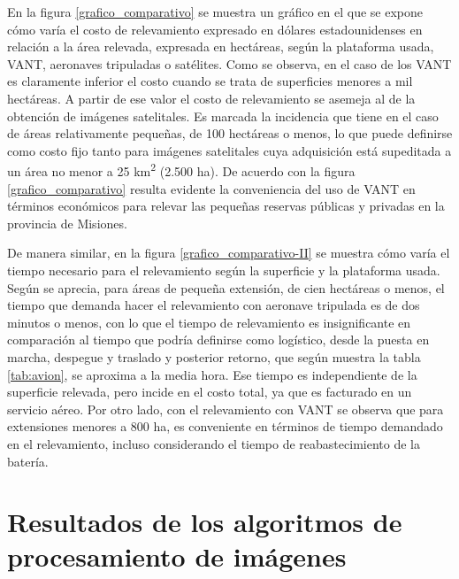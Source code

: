En la figura \ref{grafico_comparativo} se muestra un gráfico en el que se expone cómo varía el costo de relevamiento expresado en dólares estadounidenses en relación a la área relevada, expresada en hectáreas, según la plataforma usada, VANT, aeronaves tripuladas o satélites. Como se observa, en el caso de los VANT es claramente inferior el costo cuando se trata de superficies menores a mil hectáreas. A partir de ese valor el costo de relevamiento se asemeja al de la obtención de imágenes satelitales. Es marcada la incidencia que tiene en el caso de áreas relativamente pequeñas, de 100 hectáreas o menos, lo que puede definirse como costo fijo tanto para imágenes satelitales cuya adquisición está supeditada a un área no menor a 25 km\textsuperscript{2} (2.500 ha). De acuerdo con la figura \ref{grafico_comparativo} resulta evidente la conveniencia del uso de VANT en términos económicos para relevar las pequeñas reservas públicas y privadas en la provincia de Misiones.

De manera similar, en la figura \ref{grafico_comparativo-II} se muestra cómo varía el tiempo necesario para el relevamiento según la superficie y la plataforma usada. Según se aprecia, para áreas de pequeña extensión, de cien hectáreas o menos, el tiempo que demanda hacer el relevamiento con aeronave tripulada es de dos minutos o menos, con lo que el tiempo de relevamiento es insignificante en comparación al tiempo que podría definirse como logístico, desde la puesta en marcha, despegue y traslado y posterior retorno, que según muestra la tabla \ref{tab:avion}, se aproxima a la media hora. Ese tiempo es independiente de la superficie relevada, pero incide en el costo total, ya que es facturado en un servicio aéreo. Por otro lado, con el relevamiento con VANT se observa que para extensiones menores a 800 ha, es conveniente en términos de tiempo demandado en el relevamiento, incluso considerando el tiempo de reabastecimiento de la batería.

\section{Resultados de los algoritmos de procesamiento de imágenes}
